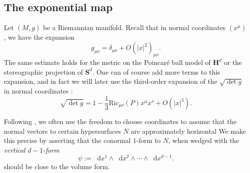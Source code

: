\documentclass[reqno,10pt]{amsart}
\newcommand{\Hyp}{\mathbf H}
\newcommand{\Sph}{\mathbf S}
\newcommand{\Ric}{\mathrm{Ric}}
\newcommand*\dif{\mathop{}\!\mathrm{d}}
\newcommand{\dfn}[1]{\emph{#1}\index{#1}}
\theoremstyle{definition}
\newtheorem{definition}[theorem]{Definition}
\numberwithin{equation}{section}
\begin{document}
\subsection{The exponential map}
Let $(M, g)$ be a Riemannian manifold.
Recall that in normal coordinates $(x^\mu)$, we have the expansion
\begin{equation}\label{expand metric}
g_{\mu\nu} = \delta_{\mu\nu} + O(|x|^2)_{\mu\nu}.
\end{equation}
The same estimate holds for the metric on the Poincar\'e ball model of $\Hyp^d$ or the stereographic projection of $\Sph^d$.
One can of course add more terms to this expansion, and in fact we will later use the third-order expansion of the $\sqrt{\det g}$ in normal coordinates \cite[Lemma 3.4]{schoen1994lectures}:
\begin{equation}\label{expand volume form}
\sqrt{\det g} = 1 - \frac{1}{3} \Ric_{\mu\nu}(P) x^\mu x^\nu + O(|x|^3).
\end{equation}

Following \cite{Giusti77}, we often use the freedom to choose coordinates to assume that the normal vectors to certain hypersurfaces $N$ are approximately horizontal
We make this precise by asserting that the conormal $1$-form to $N$, when wedged with the \dfn{vertical $d-1$-form}
\begin{equation}\label{d1 form}
\psi := \dif x^1 \wedge \dif x^2 \wedge \cdots \wedge \dif x^{d - 1}.
\end{equation}
should be close to the volume form.

\end{document}
